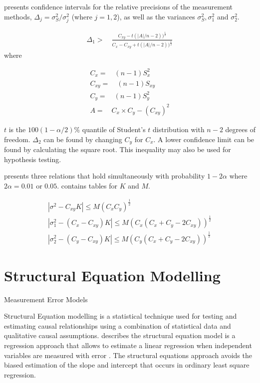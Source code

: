 \documentclass[12pt, a4paper]{report}
\theoremstyle{plain}
\theoremstyle{definition}
\theoremstyle{remark}
\begin{document}
\citet{Thompson} presents confidence intervals for the relative
precisions of the measurement methods, $\Delta_{j}=
\sigma^2_{S}/\sigma^2_{j}$ (where $j=1,2$), as well as the
variances $\sigma^{2}_{S}, \sigma^{2}_{1}$ and $\sigma^{2}_{2}$.

\begin{eqnarray}
\Delta_{1} >\quad \frac{C_{xy}-
	t(|A|/n-2))^{\frac{1}{2}}}{C_{x}-C_{xy}+
	t(|A|/n-2))^{\frac{1}{2}}}
\end{eqnarray}
where

\begin{eqnarray}
C_{x}=\quad(n-1)S^2_{x}\nonumber\\
C_{xy}=\quad(n-1)S_{xy}\nonumber\\
C_{y}=\quad(n-1)S^2_{y}\nonumber\\
A=\quad C_{x}\times C_{y} - (C_{xy})^2 \nonumber
\end{eqnarray}

$t$ is the $100(1-\alpha/2)\%$ quantile of Student's $t$
distribution with $n-2$ degrees of freedom. $\Delta_{2}$ can be
found by changing $C_{y}$ for $C_{x}$. A lower confidence limit
can be found by calculating the square root. This inequality may
also be used for hypothesis testing.

\citet{Thompson} presents three relations that hold simultaneously
with probability $1-2\alpha$ where $2\alpha=0.01$ or $0.05$. \citet{Thompson} contains tables for $K$ and $M$.

\begin{eqnarray}
|\sigma^2-C_{xy}K|\leqslant M(C_{x}C_{y})^{\frac{1}{2}}\\
|\sigma^2_{1}-(C_{x}-C_{xy})K|\leqslant M(C_{x}(C_{x}+C_{y}-2C_{xy}))^{\frac{1}{2}}\nonumber\\
|\sigma^2_{2}-(C_{y}-C_{xy})K|\leqslant
M(C_{y}(C_{x}+C_{y}-2C_{xy}))^{\frac{1}{2}}\nonumber
\end{eqnarray}	








\section{Structural Equation Modelling}
\citet{nawarathna2015} Measurement Error Models



Structural Equation modelling is a statistical technique used for testing and estimating causal relationships using a combination of statistical data and qualitative causal assumptions. \citet{carrasco2004} describes the structural equation model is a regression approach that allows to estimate a linear 
regression when independent variables are measured with error .
The structural equations approach avoids the biased estimation of the slope and intercept that occurs in ordinary least square regression.
\end{document}
